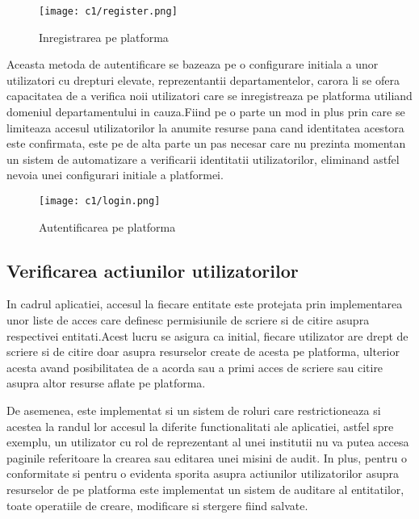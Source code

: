  	\vspace{0.5 cm}
 \begin{figure}[h]
 	\centering
 	
 	\texttt{[image: c1/register.png]}
 	\caption{Inregistrarea  pe platforma}
 \end{figure}
 
Aceasta metoda de autentificare se bazeaza pe o  configurare initiala a unor utilizatori cu drepturi elevate, reprezentantii departamentelor, carora li se ofera capacitatea de a verifica noii utilizatori care se inregistreaza pe platforma utiliand domeniul departamentului in cauza.Fiind pe o parte un mod in plus prin care se limiteaza accesul utilizatorilor la anumite resurse pana cand identitatea acestora este confirmata, este pe de alta parte un pas necesar care nu prezinta momentan un sistem de automatizare a verificarii identitatii utilizatorilor, eliminand astfel nevoia unei configurari initiale a platformei.
	\vspace{0.5 cm}
\begin{figure}[h]
	\centering
	
	\texttt{[image: c1/login.png]}
	\caption{Autentificarea pe platforma}
\end{figure}

\subsection{Verificarea actiunilor utilizatorilor}
In cadrul aplicatiei, accesul la fiecare entitate este protejata prin implementarea unor liste de acces care definesc permisiunile de scriere si de citire asupra respectivei entitati.Acest lucru se asigura ca initial, fiecare utilizator are drept de scriere si de citire doar asupra resurselor create de acesta pe platforma, ulterior acesta avand posibilitatea de a acorda sau a primi acces de scriere sau citire asupra altor resurse aflate pe platforma.
	
De asemenea, este implementat si un sistem de roluri care restrictioneaza si acestea la randul lor accesul la diferite functionalitati ale aplicatiei, astfel spre exemplu, un utilizator cu rol de reprezentant al unei institutii nu va putea accesa paginile referitoare la crearea sau editarea unei misini de audit.
In plus, pentru o conformitate si pentru o evidenta sporita asupra actiunilor utilizatorilor asupra resurselor de pe platforma este implementat un sistem de auditare al entitatilor, toate operatiile de creare, modificare si stergere fiind salvate.

